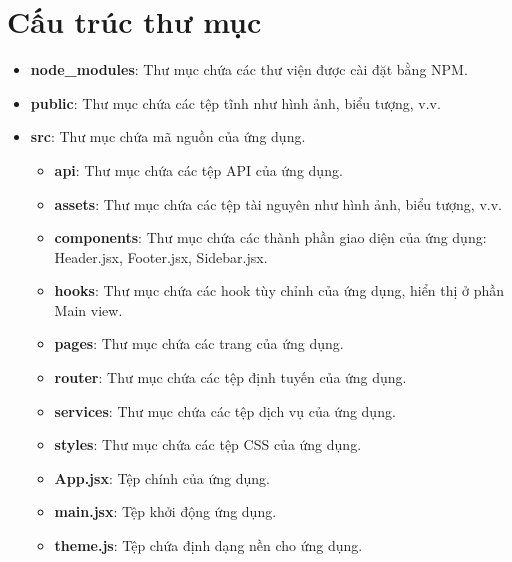     \section{Cấu trúc thư mục}
        \begin{itemize}
            \item \textbf{node\_modules}: Thư mục chứa các thư viện được cài đặt bằng NPM.
            \item \textbf{public}: Thư mục chứa các tệp tĩnh như hình ảnh, biểu tượng, v.v.
            \item \textbf{src}: Thư mục chứa mã nguồn của ứng dụng.
                \begin{itemize}
                    \item \textbf{api}: Thư mục chứa các tệp API của ứng dụng.
                    \item \textbf{assets}: Thư mục chứa các tệp tài nguyên như hình ảnh, biểu tượng, v.v.
                    \item \textbf{components}: Thư mục chứa các thành phần giao diện của ứng dụng: Header.jsx, Footer.jsx, Sidebar.jsx.
                    \item \textbf{hooks}: Thư mục chứa các hook tùy chỉnh của ứng dụng, hiển thị ở phần Main view.
                    \item \textbf{pages}: Thư mục chứa các trang của ứng dụng.
                    \item \textbf{router}: Thư mục chứa các tệp định tuyến của ứng dụng.
                    \item \textbf{services}: Thư mục chứa các tệp dịch vụ của ứng dụng.
                    \item \textbf{styles}: Thư mục chứa các tệp CSS của ứng dụng.
                    \item \textbf{App.jsx}: Tệp chính của ứng dụng.
                    \item \textbf{main.jsx}: Tệp khởi động ứng dụng.
                    \item \textbf{theme.js}: Tệp chứa định dạng nền cho ứng dụng.
                \end{itemize}
        \end{itemize}
